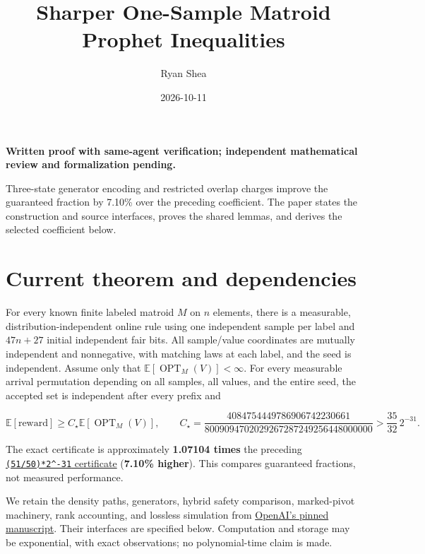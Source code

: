 \documentclass[11pt]{article}
\title{Sharper One-Sample Matroid Prophet Inequalities}
\author{Ryan Shea}
\date{2026-10-11}
\begin{document}
\maketitle
\textbf{Written proof with same-agent verification; independent mathematical review and formalization pending.}

Three-state generator encoding and restricted overlap charges improve the guaranteed fraction by 7.10\% over the preceding coefficient. The paper states the construction and source interfaces, proves the shared lemmas, and derives the selected coefficient below.

\section{Current theorem and dependencies}\label{current-theorem-and-dependencies}

For every known finite labeled matroid \(M\) on \(n\) elements, there is a measurable, distribution-independent online rule using one independent sample per label and \(47n+27\) initial independent fair bits. All sample/value coordinates are mutually independent and nonnegative, with matching laws at each label, and the seed is independent. Assume only that \(\mathbb E[\operatorname{OPT}_M(V)]<\infty\). For every measurable arrival permutation depending on all samples, all values, and the entire seed, the accepted set is independent after every prefix and

\[\mathbb E[\mathrm{reward}]\ge C_\star\mathbb E[\operatorname{OPT}_M(V)],\qquad
C_\star=\frac{4084754449786906742230661}{8009094702029267287249256448000000}>\frac{35}{32}\, 2^{-31}.\]

The exact certificate is approximately \textbf{1.07104 times} the preceding \href{https://github.com/shea256/matroid-prophet-inequality/blob/master/results/activation-split.md}{\texttt{(51/50)*2\^{}-31} certificate} (\textbf{7.10\% higher}). This compares guaranteed fractions, not measured performance.

We retain the density paths, generators, hybrid safety comparison, marked-pivot machinery, rank accounting, and lossless simulation from \href{https://github.com/openai/math/blob/fd4aeeb2ee4fc729c18d98444fed42fd0529eeeb/preprints/One-Sample-Suffices-for-Matroid-Prophet-Inequalities-against-an-Almighty-Adversary-September-23-2026/final.pdf}{OpenAI's pinned manuscript}. Their interfaces are specified below. Computation and storage may be exponential, with exact observations; no polynomial-time claim is made.
\end{document}
